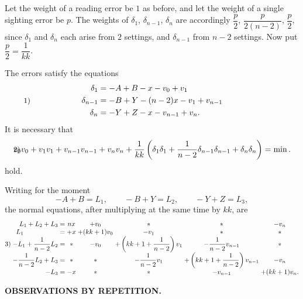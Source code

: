 Let the weight of a reading error be $1$ as before, and let the weight of a single sighting error be $p$. The weights of $\delta_1$, $\delta_{n-1}$, $\delta_n$ are accordingly $\dfrac{p}{2}$, $\dfrac{p}{2(n-2)}$, $\dfrac{p}{2}$, since $\delta_1$ and $\delta_n$ each arise from $2$ settings, and $\delta_{n-1}$ from $n-2$ settings. Now put $\dfrac{p}{2}=\dfrac{1}{kk}$.

The errors satisfy the equations
\[
\makebox[\linewidth]{\hspace*{\parindent}\makebox[0pt][l]{\small 1)}\hfill
\(\displaystyle
 \begin{aligned}
  \delta_1 &= -A+B-x-v_0+v_1\\
  \delta_{n-1} &= -B+Y-(n-2)x-v_1+v_{n-1}\\
  \delta_n &= -Y+Z-x-v_{n-1}+v_n.
 \end{aligned}
\)\hfill\hspace*{\parindent}}
\]
\indent It is necessary that
\[
\makebox[\linewidth]{\hspace*{\parindent}\makebox[0pt][l]{\small 2)}\hfill
\(\displaystyle
 v_0v_0+v_1v_1+v_{n-1}v_{n-1}+v_nv_n+
 \frac{1}{kk}\left(\delta_1\delta_1+
 \frac{1}{n-2}\delta_{n-1}\delta_{n-1}+\delta_n\delta_n\right)=\min.
\)\hfill\hspace*{\parindent}}
\]
hold.

Writing for the moment
\[
 -A+B=L_1,\qquad -B+Y=L_2,\qquad -Y+Z=L_3,
\]
the normal equations, after multiplying at the same time by $kk$, are
{\small
\[
\begin{array}{@{}l@{\;}r@{\;}c@{\;}c@{\;}c@{\;}c@{\;}c@{\;}c@{}}
 & L_1+L_2+L_3 &=& nx & +v_0 & * & * & -v_n\\
 & \multicolumn{1}{l@{\;}}{L_1} &=& +x & +(kk+1)v_0 & -v_1 & * & *\\
 \text{3)} & -L_1+\dfrac{1}{n-2}L_2 &=& * & -v_0 &
  +\left(kk+1+\dfrac{1}{n-2}\right)v_1 & -\dfrac{1}{n-2}v_{n-1} & *\\[3pt]
 & -\dfrac{1}{n-2}L_2+L_3 &=& * & * &
  -\dfrac{1}{n-2}v_1 & +\left(kk+1+\dfrac{1}{n-2}\right)v_{n-1} & -v_n\\[3pt]
 & -L_3 &=& -x & * & * & -v_{n-1} & +(kk+1)v_n.
\end{array}
\]
}

\par\clearpage
\noindent\null\hfill{\small\textbf{OBSERVATIONS BY REPETITION.}}\hfill{}\par\medskip

